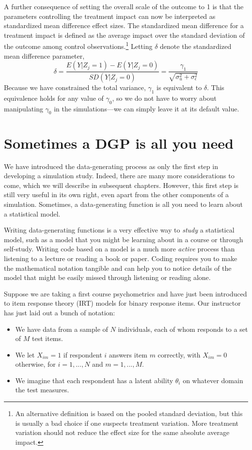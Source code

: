 \documentclass[
]{book}
\providecommand{\tightlist}{%
  \setlength{\itemsep}{0pt}\setlength{\parskip}{0pt}}
\begin{document}
A further consequence of setting the overall scale of the outcome to 1 is that the parameters controlling the treatment impact can now be interpreted as standardized mean difference effect sizes.
The standardized mean difference for a treatment impact is defined as the average impact over the standard deviation of the outcome among control observations.\footnote{An alternative definition is based on the pooled standard deviation, but this is usually a bad choice if one suspects treatment variation. More treatment variation should not reduce the effect size for the same absolute average impact.}
Letting \(\delta\) denote the standardized mean difference parameter,
\[ \delta = \frac{E(Y | Z_j = 1) - E(Y | Z_j = 0)}{SD( Y | Z_j = 0 )} = \frac{\gamma_1}{\sqrt{ \sigma^2_u + \sigma^2_\epsilon } } \]
Because we have constrained the total variance, \(\gamma_1\) is equivalent to \(\delta\). This equivalence holds for any value of \(\gamma_0\), so we do not have to worry about manipulating \(\gamma_0\) in the simulations---we can simply leave it at its default value.

\section{Sometimes a DGP is all you need}\label{three-parameter-IRT}

We have introduced the data-generating process as only the first step in developing a simulation study. Indeed, there are many more considerations to come, which we will describe in subsequent chapters.
However, this first step is still very useful in its own right, even apart from the other components of a simulation.
Sometimes, a data-generating function is all you need to learn about a statistical model.

Writing data-generating functions is a very effective way to \emph{study} a statistical model, such as a model that you might be learning about in a course or through self-study.
Writing code based on a model is a much more \emph{active} process than listening to a lecture or reading a book or paper.
Coding requires you to make the mathematical notation tangible and can help you to notice details of the model that might be easily missed through listening or reading alone.

Suppose we are taking a first course psychometrics and have just been introduced to item response theory (IRT) models for binary response items.
Our instructor has just laid out a bunch of notation:

\begin{itemize}
\tightlist
\item
  We have data from a sample of \(N\) individuals, each of whom responds to a set of \(M\) test items.
\item
  We let \(X_{im} = 1\) if respondent \(i\) answers item \(m\) correctly, with \(X_{im} = 0\) otherwise, for \(i = 1,...,N\) and \(m = 1,...,M\).
\item
  We imagine that each respondent has a latent ability \(\theta_i\) on whatever domain the test measures.
\end{itemize}
\end{document}
